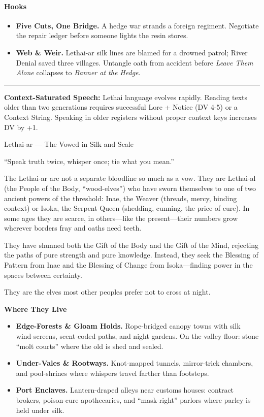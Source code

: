 \documentclass[11pt]{article}
\begin{document}
\paragraph{Hooks}
\begin{itemize}[leftmargin=*]
  \item \textbf{Five Cuts, One Bridge.} A hedge war strands a foreign regiment. Negotiate the repair ledger before someone lights the resin stores.
  \item \textbf{Web \& Weir.} Lethai-ar silk lines are blamed for a drowned patrol; River Denial saved three villages. Untangle oath from accident before \emph{Leave Them Alone} collapses to \emph{Banner at the Hedge}.
\end{itemize}

\medskip\hrule\medskip

\textbf{Context-Saturated Speech:} Lethai language evolves rapidly. Reading texts older than two generations requires successful Lore + Notice (DV 4-5) or a Context String. Speaking in older registers without proper context keys increases DV by +1.

\begin{center}
  {\LARGE Lethai-ar --- The Vowed in Silk and Scale}
  
  \bigskip
  {\large ``Speak truth twice, whisper once; tie what you mean.''}
  \end{center}
  
  The Lethai-ar are not a separate bloodline so much as a vow. They are Lethai-al (the People of the Body, ``wood-elves'') who have sworn themselves to one of two ancient powers of the threshold: Inae, the Weaver (threads, mercy, binding context) or Isoka, the Serpent Queen (shedding, cunning, the price of cure). In some ages they are scarce, in others---like the present---their numbers grow wherever borders fray and oaths need teeth.
  
  They have shunned both the Gift of the Body and the Gift of the Mind, rejecting the paths of pure strength and pure knowledge. Instead, they seek the Blessing of Pattern from Inae and the Blessing of Change from Isoka---finding power in the spaces between certainty.
  
  They are the elves most other peoples prefer not to cross at night.
  
  \bigskip
  
  \textbf{Where They Live}
  
  \begin{itemize}
  \item \textbf{Edge-Forests \& Gloam Holds.} Rope-bridged canopy towns with silk wind-screens, scent-coded paths, and night gardens. On the valley floor: stone ``molt courts'' where the old is shed and sealed.
  \item \textbf{Under-Vales \& Rootways.} Knot-mapped tunnels, mirror-trick chambers, and pool-shrines where whispers travel farther than footsteps.
  \item \textbf{Port Enclaves.} Lantern-draped alleys near customs houses: contract brokers, poison-cure apothecaries, and ``mask-right'' parlors where parley is held under silk.
  \end{itemize}
  
\end{document}
